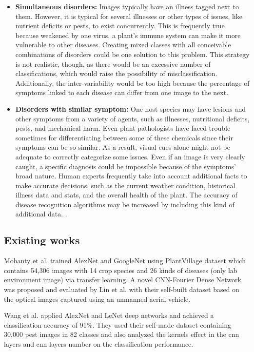 \begin{itemize}
    \item \textbf{Simultaneous disorders:} Images typically have an illness tagged next to them. However, it is typical for several illnesses or other types of issues, like nutrient deficits or pests, to exist concurrently. This is frequently true because weakened by one virus, a plant's immune system can make it more vulnerable to other diseases. Creating mixed classes with all conceivable combinations of disorders could be one solution to this problem. This strategy is not realistic, though, as there would be an excessive number of classifications, which would raise the possibility of misclassification. Additionally, the inter-variability would be too high because the percentage of symptoms linked to each disease can differ from one image to the next. 
    \item \textbf{Disorders with similar symptom:} One host species may have lesions and other symptoms from a variety of agents, such as illnesses, nutritional deficits, pests, and mechanical harm. Even plant pathologists have faced trouble sometimes for differentiating between some of these chemicals since their symptoms can be so similar.
As a result, visual cues alone might not be adequate to correctly categorize some issues.
Even if an image is very clearly caught, a specific diagnosis could be impossible because of the symptoms' broad nature.
Human experts frequently take into account additional facts to make accurate decisions, such as the current weather condition, historical illness data and stats, and the overall health of the plant.
The accuracy of disease recognition algorithms may be increased by including this kind of additional data.  \cite{14_kamilaris2018deep}.
\end{itemize}
\subsection{Existing works}
Mohanty et al. \cite{mohanty2016using} trained AlexNet and GoogleNet using PlantVillage dataset which contains 54,306 images with 14 crop species and 26 kinds of diseases (only lab environment image) via transfer learning. A novel CNN-Fourier Dense Network was proposed and evaluated by Lin et al. \cite{lin2019fourier} with their self-built dataset based on the optical images captured using an unmanned aerial vehicle.

Wang et al. \cite{wang2017crop} applied AlexNet and LeNet deep networks and achieved a classification accuracy of 91\%. They used their self-made dataset containing 30,000 pest images in 82 classes and also analyzed the kernels effect in the cnn layers and cnn layers number on the classification performance.

